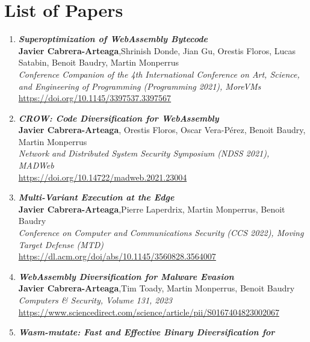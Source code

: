 
\chapter{List of Papers}

\begin{enumerate}[I]
	\item \textbf{\textit{Superoptimization of WebAssembly Bytecode}} \\
		\textbf{Javier Cabrera-Arteaga},Shrinish Donde, Jian Gu, Orestis Floros, Lucas Satabin, Benoit Baudry, Martin Monperrus\\
		\textit{Conference Companion of the 4th International Conference on Art, Science, and Engineering of Programming (Programming 2021), MoreVMs} \\
        \url{https://doi.org/10.1145/3397537.3397567}
    \item \textbf{\textit{CROW: Code Diversification for WebAssembly}} \\
        \textbf{Javier Cabrera-Arteaga}, Orestis Floros, Oscar Vera-Pérez, Benoit Baudry, Martin Monperrus\\
        \textit{Network and Distributed System Security Symposium (NDSS 2021), MADWeb} \\
        \url{https://doi.org/10.14722/madweb.2021.23004}
    \item \textbf{\textit{Multi-Variant Execution at the Edge}} \\
        \textbf{Javier Cabrera-Arteaga},Pierre Laperdrix, Martin Monperrus, Benoit Baudry\\
        \textit{Conference on Computer and Communications Security (CCS 2022), Moving Target Defense (MTD)} \\
        \url{https://dl.acm.org/doi/abs/10.1145/3560828.3564007}
    \item \textbf{\textit{WebAssembly Diversification for Malware Evasion}} \\
        \textbf{Javier Cabrera-Arteaga},Tim Toady, Martin Monperrus, Benoit Baudry\\
        \textit{Computers \& Security, Volume 131, 2023} \\
        \url{https://www.sciencedirect.com/science/article/pii/S0167404823002067}
    \item \textbf{\textit{Wasm-mutate: Fast and Effective Binary Diversification for
}}
\end{enumerate}
